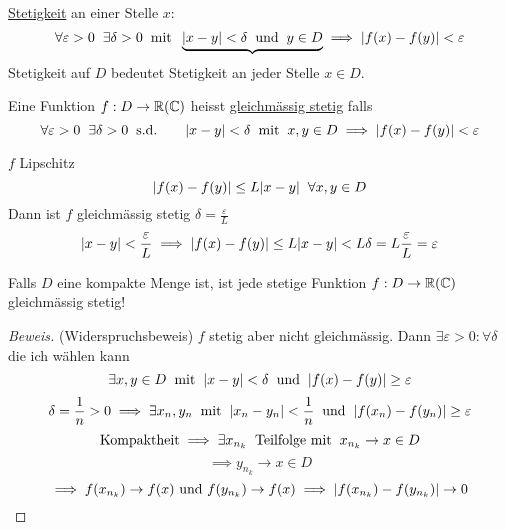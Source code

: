 \begin{Def}
  \ul{Stetigkeit} an einer Stelle $x$:
  \[\forall \varepsilon>0\hspace{2mm}\exists\delta>0\hspace{2mm}\text{mit}\hspace{2mm}\underbrace{\mathopen| x-y \mathclose|<\delta\hspace{2mm}\text{und}\hspace{2mm} y\in D}\implies \mathopen| f(x)-f(y) \mathclose|<\varepsilon\]
  Stetigkeit auf $D$ bedeutet Stetigkeit an jeder Stelle $x\in D$.
\end{Def}
\begin{Def}
  Eine Funktion $f:D\to\mathbb{R}(\mathbb{C})$ heisst \ul{gleichmässig stetig} falls
  \[\forall \varepsilon>0\hspace{2mm}\exists\delta>0\hspace{2mm}\text{s.d. }\quad\hspace{2mm}\mathopen| x-y \mathclose|<\delta\hspace{2mm}\text{mit}\hspace{2mm} x,y\in D\implies \mathopen| f(x)-f(y) \mathclose|<\varepsilon\]
\end{Def}
\begin{Bsp}
  $f$ Lipschitz
  \[\mathopen| f(x)-f(y) \mathclose|\leq L\mathopen| x-y \mathclose|\hspace{2mm}\forall x,y\in D\]
  Dann ist $f$ gleichmässig stetig $\delta=\frac{\varepsilon}{L}$
  \[\mathopen| x-y \mathclose|<\frac{\varepsilon}{L}\implies \mathopen| f(x)-f(y) \mathclose|\leq L\mathopen| x-y \mathclose|<L \delta=L\frac{\varepsilon}{L}=\varepsilon\]
\end{Bsp}
\begin{Sat}
  Falls $D$ eine kompakte Menge ist, ist jede stetige Funktion $f:D\to \mathbb{R}(\mathbb{C})$ gleichmässig stetig!
\end{Sat}
\begin{proof}[Beweis]
  (Widerspruchsbeweis) $f$ stetig aber nicht gleichmässig. Dann $\exists \varepsilon>0:\forall \delta$ die ich wählen kann
  \[\exists x,y\in D\hspace{2mm}\text{mit}\hspace{2mm}\mathopen| x-y \mathclose|<\delta\hspace{2mm}\text{und}\hspace{2mm}\mathopen| f(x)-f(y) \mathclose|\geq \varepsilon\]
  \[\delta=\frac{1}{n}>0\implies\exists x_n,y_n\hspace{2mm}\text{mit}\hspace{2mm}\mathopen| x_n-y_n \mathclose|<\frac{1}{n}\hspace{2mm}\text{und}\hspace{2mm}\mathopen| f(x_n)-f(y_n) \mathclose|\geq \varepsilon\]
  \[\text{Kompaktheit}\implies\exists x_{n_k}\hspace{2mm}\text{Teilfolge mit}\hspace{2mm} x_{n_k}\to x\in D\]
  \[\implies y_{n_k}\to x\in D\]
  \[\implies f(x_{n_k})\to f(x) \mbox{ und } f(y_{n_k})\to f(x)\implies \mathopen| f(x_{n_k})-f(y_{n_k}) \mathclose|\to 0\]
\end{proof}
